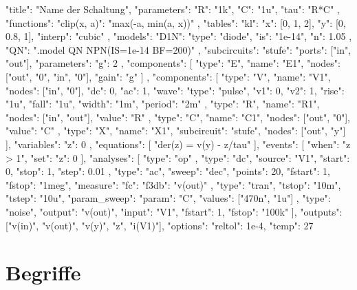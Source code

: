 \begin{json}
{
  "title": "Name der Schaltung",
  "parameters": { "R": "1k", "C": "1u", "tau": "R*C" },
  "functions":  { "clip(x, a)": "max(-a, min(a, x))" },
  "tables":     { "kl": { "x": [0, 1, 2], "y": [0, 0.8, 1], "interp": "cubic" } },
  "models": {
    "D1N": { "type": "diode", "is": "1e-14", "n": 1.05 },
    "QN":  ".model QN NPN(IS=1e-14 BF=200)"
  },
  "subcircuits": {
    "stufe": {
      "ports": ["in", "out"], "parameters": { "g": 2 },
      "components": [
        { "type": "E", "name": "E1", "nodes": ["out", "0", "in", "0"], "gain": "g" }
      ]
    }
  },
  "components": [
    { "type": "V", "name": "V1", "nodes": ["in", "0"], "dc": 0, "ac": 1,
      "wave": { "type": "pulse", "v1": 0, "v2": 1, "rise": "1u", "fall": "1u",
                "width": "1m", "period": "2m" } },
    { "type": "R", "name": "R1", "nodes": ["in", "out"], "value": "R" },
    { "type": "C", "name": "C1", "nodes": ["out", "0"], "value": "C" },
    { "type": "X", "name": "X1", "subcircuit": "stufe", "nodes": ["out", "y"] }
  ],
  "variables": { "z": 0 },
  "equations": [ "der(z) = v(y) - z/tau" ],
  "events":    [ { "when": "z > 1", "set": { "z": 0 } } ],
  "analyses": [
    { "type": "op" },
    { "type": "dc", "source": "V1", "start": 0, "stop": 1, "step": 0.01 },
    { "type": "ac", "sweep": "dec", "points": 20, "fstart": 1, "fstop": "1meg",
      "measure": { "fc": { "f3db": "v(out)" } } },
    { "type": "tran", "tstop": "10m", "tstep": "10u",
      "param_sweep": { "param": "C", "values": ["470n", "1u"] } },
    { "type": "noise", "output": "v(out)", "input": "V1",
      "fstart": 1, "fstop": "100k" }
  ],
  "outputs": ["v(in)", "v(out)", "v(y)", "z", "i(V1)"],
  "options": { "reltol": 1e-4, "temp": 27 }
}
\end{json}

\chapter{Begriffe}

